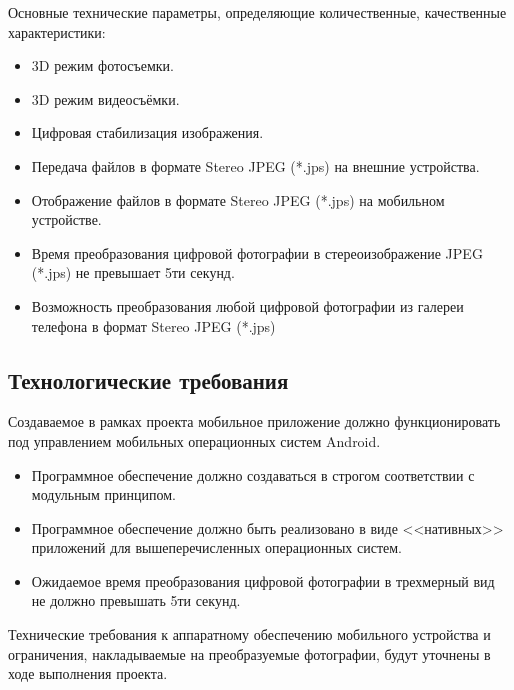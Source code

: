 Основные технические параметры, определяющие количественные, качественные характеристики:

\begin{itemize}
\item 3D режим фотосъемки.
\item 3D режим видеосъёмки. 
\item Цифровая стабилизация изображения.
\item Передача файлов в формате Stereo JPEG (*.jps) на внешние устройства. 
\item Отображение файлов в формате Stereo JPEG (*.jps) на мобильном устройстве. 
\item Время преобразования цифровой фотографии в стереоизображение JPEG (*.jps) не превышает 5ти секунд. 
\item Возможность преобразования любой цифровой фотографии из галереи телефона в формат Stereo JPEG (*.jps)
\end{itemize}

\subsection{Технологические требования}

Создаваемое в рамках проекта мобильное приложение должно
функционировать под управлением мобильных операционных систем Android.

\begin{itemize}
	\item Программное обеспечение должно создаваться в строгом соответствии с модульным принципом.
	\item Программное обеспечение должно быть реализовано в виде <<нативных>> приложений для вышеперечисленных операционных систем.
	\item Ожидаемое время преобразования цифровой фотографии в трехмерный вид не должно превышать 5ти секунд. 
\end{itemize}

Технические требования к аппаратному обеспечению мобильного устройства и ограничения, накладываемые на преобразуемые фотографии, будут уточнены в ходе выполнения проекта.


